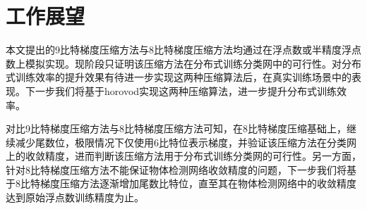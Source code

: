 \section{工作展望}
本文提出的9比特梯度压缩方法与8比特梯度压缩方法均通过在浮点数或半精度浮点数上模拟实现。现阶段只证明该压缩方法在分布式训练分类网中的可行性。对分布式训练效率的提升效果有待进一步实现这两种压缩算法后，在真实训练场景中的表现。下一步我们将基于horovod实现这两种压缩算法，进一步提升分布式训练效率。

对比9比特梯度压缩方法与8比特梯度压缩方法可知，在8比特梯度压缩基础上，继续减少尾数位，极限情况下仅使用6比特位表示梯度，并验证该压缩方法在分类网上的收敛精度，进而判断该压缩方法用于分布式训练分类网的可行性。另一方面，针对8比特梯度压缩方法不能保证物体检测网络收敛精度的问题，下一步我们将基于8比特梯度压缩方法逐渐增加尾数比特位，直至其在物体检测网络中的收敛精度达到原始浮点数训练精度为止。